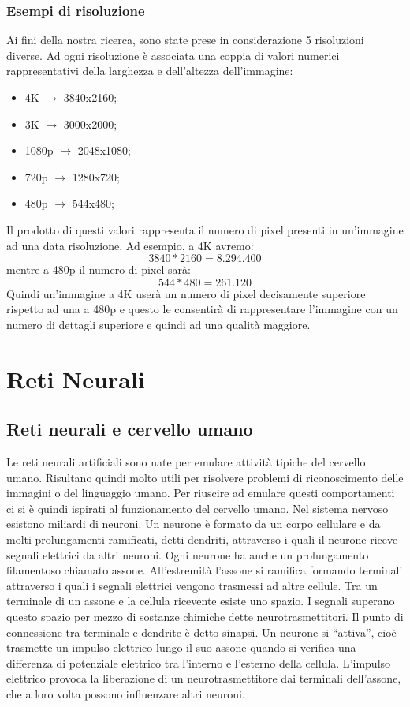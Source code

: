 \documentclass[a4paper,11pt]{article}
\begin{document}
    \subsubsection{Esempi di risoluzione}
    Ai fini della nostra ricerca, sono state prese in considerazione 5 risoluzioni diverse. Ad ogni risoluzione
    è associata una coppia di valori numerici rappresentativi della larghezza e dell'altezza dell'immagine:
    \begin{itemize}
        \item 4K $\rightarrow$ 3840x2160;
        \item 3K $\rightarrow$ 3000x2000;
        \item 1080p $\rightarrow$ 2048x1080;
        \item 720p $\rightarrow$ 1280x720;
        \item 480p $\rightarrow$ 544x480;
    \end{itemize}
    Il prodotto di questi valori rappresenta il numero di pixel presenti in un'immagine ad una data risoluzione.
    Ad esempio, a 4K avremo:
    $$3840*2160 = 8.294.400$$
    mentre a 480p il numero di pixel sarà:
    $$544*480 = 261.120$$
    Quindi un'immagine a 4K userà un numero di pixel decisamente superiore rispetto ad una a 480p e questo le consentirà
    di rappresentare l'immagine con un numero di dettagli superiore e quindi ad una qualità maggiore.
    \newpage
    \section {Reti Neurali}
    \subsection {Reti neurali e cervello umano}
    Le reti neurali artificiali sono nate per emulare attività tipiche del
    cervello umano. Risultano quindi molto utili per risolvere problemi di riconoscimento delle immagini o del linguaggio umano.
    Per riuscire ad emulare questi comportamenti ci si è quindi ispirati al funzionamento del cervello umano.
    Nel sistema nervoso esistono miliardi di neuroni. Un
    neurone è formato da un corpo cellulare e da molti prolungamenti
    ramificati, detti dendriti, attraverso i quali il neurone riceve segnali
    elettrici da altri neuroni. Ogni neurone ha anche un prolungamento
    filamentoso chiamato assone. All’estremità l’assone si ramifica formando terminali
    attraverso i quali i segnali elettrici vengono trasmessi ad altre cellule.
    Tra un terminale di un assone e la cellula ricevente esiste uno spazio. I segnali superano questo spazio per
    mezzo di sostanze chimiche dette neurotrasmettitori. Il punto di
    connessione tra terminale e dendrite è detto sinapsi. 
    Un neurone si “attiva”, cioè trasmette un impulso elettrico lungo il suo
    assone quando si verifica una differenza di potenziale elettrico tra l’interno
    e l’esterno della cellula. L’impulso elettrico provoca la liberazione di un
    neurotrasmettitore dai terminali dell’assone, che a loro volta possono influenzare altri neuroni. 
        
\end{document}
